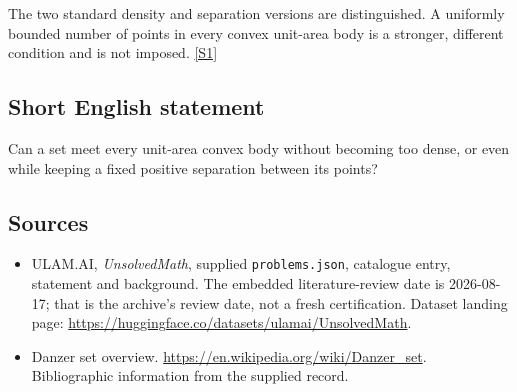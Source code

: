 \documentclass[11pt,a4paper]{article}
\newcommand{\sref}[2]{\hyperlink{source:#1:#2}{[S#2]}}
\begin{document}
The two standard density and separation versions are distinguished. A uniformly bounded number of points in every convex unit-area body is a stronger, different condition and is not imposed. \sref{statement}{1}

\subsection{Short English statement}

Can a set meet every unit-area convex body without becoming too dense, or even while keeping a fixed positive separation between its points?

\subsection{Sources}

{\small

\begin{itemize}

\item[\hypertarget{source:statement:1}{S1}] ULAM.AI, \emph{UnsolvedMath}, supplied \texttt{problems.json}, catalogue entry, statement and background. The embedded literature-review date is 2026-08-17; that is the archive’s review date, not a fresh certification. Dataset landing page: \url{https://huggingface.co/datasets/ulamai/UnsolvedMath}.

\item[\hypertarget{source:statement:2}{S2}] Danzer set overview. \url{https://en.wikipedia.org/wiki/Danzer_set}. Bibliographic information from the supplied record.

\end{itemize}

}

\label{end:statement}
\end{document}
